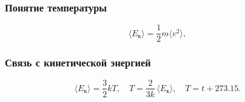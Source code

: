 \documentclass[12pt, a4paper]{article}
\begin{document}
\subsubsection*{Понятие температуры}

\[
\langle E_{\text{к}} \rangle = \frac12 m \langle v^2 \rangle,
\]

\subsubsection*{Связь с кинетической энергией}

\[
\langle E_{\text{к}}\rangle = \frac32 k T,
\quad
T = \frac{2}{3k}\,\langle E_{\text{к}}\rangle,
\quad
T = t + 273{.}15.
\]
\end{document}
